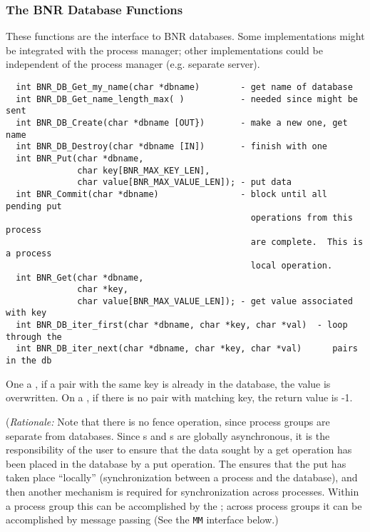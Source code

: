 \documentclass{article}
\begin{document}
\subsubsection{The BNR Database Functions}
\label{sec:bnr-database}

These functions are the interface to BNR databases.  Some implementations might
be integrated with the process manager; other implementations could be
independent of the process manager (e.g. separate server). 

\begin{verbatim}
  int BNR_DB_Get_my_name(char *dbname)        - get name of database
  int BNR_DB_Get_name_length_max( )           - needed since might be sent
  int BNR_DB_Create(char *dbname [OUT})       - make a new one, get name 
  int BNR_DB_Destroy(char *dbname [IN])       - finish with one 
  int BNR_Put(char *dbname,
              char key[BNR_MAX_KEY_LEN],
              char value[BNR_MAX_VALUE_LEN]); - put data
  int BNR_Commit(char *dbname)                - block until all pending put
                                                operations from this process
                                                are complete.  This is a process
                                                local operation.
  int BNR_Get(char *dbname,
              char *key,
              char value[BNR_MAX_VALUE_LEN]); - get value associated with key
  int BNR_DB_iter_first(char *dbname, char *key, char *val)  - loop through the
  int BNR_DB_iter_next(char *dbname, char *key, char *val)      pairs in the db
\end{verbatim}
  
One a , if a pair with the same key is already in the database,
the value is overwritten.  On a , if there is no pair with
matching key, the return value is -1.  

({\em Rationale:\/}  Note that there is no fence operation, since process
groups are separate from databases.  Since s and s
are globally asynchronous, it is the responsibility of the user to ensure that
the data sought by a get operation has been placed in the database by a put
operation.  The  ensures that the put has taken place
``locally'' (synchronization between a process and the database), and then
another mechanism is required for synchronization across processes.  Within
a process group this can be accomplished by the ; across
process groups it can be accomplished by message passing (See the {\tt MM}
interface below.)
\end{document}
